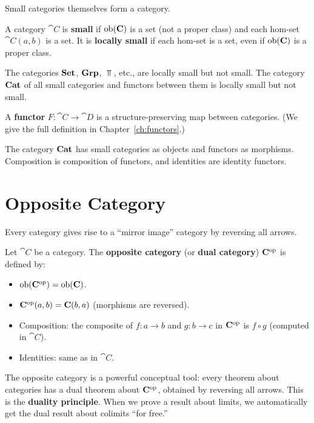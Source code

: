 Small categories themselves form a category.

\begin{definition}
A category $\cat{C}$ is \textbf{small} if $\operatorname{ob}(\mathbf{C})$ is a set (not a proper class) and each hom-set $\cat{C}(a,b)$ is a set. It is \textbf{locally small} if each hom-set is a set, even if $\operatorname{ob}(\mathbf{C})$ is a proper class.
\end{definition}

The categories $\mathbf{Set}$, $\mathbf{Grp}$, $\Top$, etc., are locally small but not small. The category $\Cat$ of all small categories and functors between them is locally small but not small.

\begin{definition}
A \textbf{functor} $F: \cat{C} \to \cat{D}$ is a structure-preserving map between categories. (We give the full definition in Chapter~\ref{ch:functors}.)
\end{definition}

\begin{definition}[$\Cat$]
The category $\Cat$ has small categories as objects and functors as morphisms. Composition is composition of functors, and identities are identity functors.
\end{definition}

\section{Opposite Category}

Every category gives rise to a ``mirror image'' category by reversing all arrows.

\begin{definition}
Let $\cat{C}$ be a category. The \textbf{opposite category} (or \textbf{dual category}) $\mathbf{C}^{\mathrm{op}}$ is defined by:
\begin{itemize}
  \item $\operatorname{ob}(\mathbf{C}^{\mathrm{op}}) = \operatorname{ob}(\mathbf{C})$.
  \item $\mathbf{C}^{\mathrm{op}}(a,b) = \mathbf{C}(b,a)$ (morphisms are reversed).
  \item Composition: the composite of $f: a \to b$ and $g: b \to c$ in $\mathbf{C}^{\mathrm{op}}$ is $f \circ g$ (computed in $\cat{C}$).
  \item Identities: same as in $\cat{C}$.
\end{itemize}
\end{definition}

The opposite category is a powerful conceptual tool: every theorem about categories has a dual theorem about $\mathbf{C}^{\mathrm{op}}$, obtained by reversing all arrows. This is the \textbf{duality principle}. When we prove a result about limits, we automatically get the dual result about colimits ``for free.''


